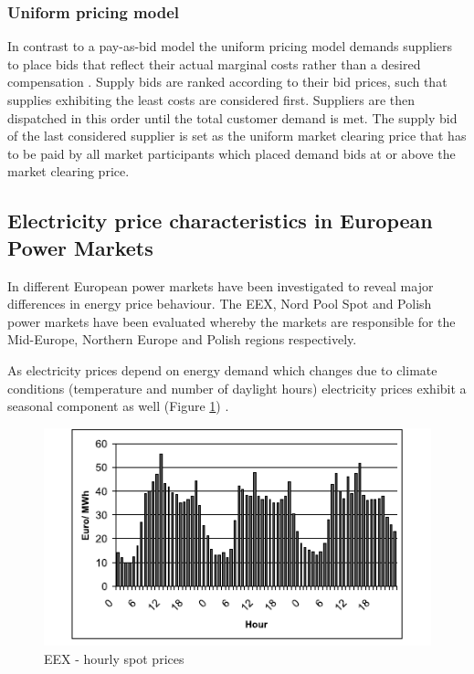\subsubsection{Uniform pricing model}

In contrast to a pay-as-bid model the uniform pricing model demands suppliers to place bids that reflect their actual marginal costs rather than a desired compensation \cite{tierney2008uniform}. Supply bids are ranked according to their bid prices, such that supplies exhibiting the least costs are considered first. Suppliers are then dispatched in this order until the total customer demand is met. The supply bid of the last considered supplier is set as the uniform market clearing price that has to be paid by all market participants which placed demand bids at or above the market clearing price. 

\subsection{Electricity price characteristics in European Power Markets}

In \cite{mugele2005stable} different European power markets have been investigated to reveal major differences in energy price behaviour. The EEX, Nord Pool Spot and Polish power markets have been evaluated whereby the markets are responsible for the Mid-Europe, Northern Europe and Polish regions respectively. 

As electricity prices depend on energy demand which changes due to climate conditions (temperature and number of daylight hours) electricity prices exhibit a seasonal component as well (Figure \ref{fig:seasonal_behaviour_of_eex_prices}) \cite{weron2005forecasting}. 

\begin{figure}[htbp]
	\centering
		\includegraphics{figures/state_of_the_art/seasonal_behaviour_of_eex_prices.PNG}
	\caption{EEX - hourly spot prices \cite{mugele2005stable}}
	\label{fig:seasonal_behaviour_of_eex_prices}
\end{figure}

